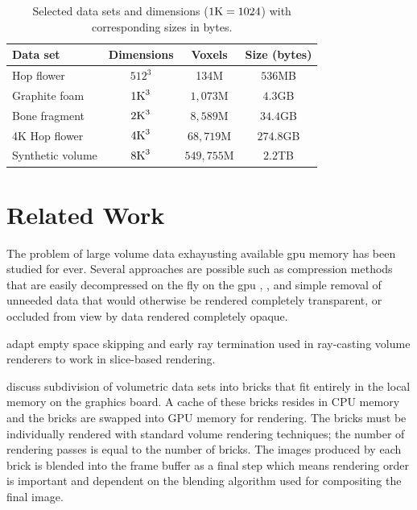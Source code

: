 \documentclass[journal]{vgtc}                %
\begin{document}
\begin{table}[h]
 	 \caption{Selected data sets and dimensions ($1\textnormal{K}=\nobreak1024$) 
	 	 	with corresponding sizes in bytes.}\label{table:targetedDataSets}
	 \scriptsize
	\begin{center}
		\begin{tabular}{lccc}
			\textbf{Data set} & \textbf{Dimensions} & \textbf{Voxels} & \textbf{Size} (bytes)\\
			\hline
			Hop flower & $512^3$ & 134M & $536$MB \\
			Graphite foam & $1\textnormal{K}^3$ & $1,073$M & $4.3$GB  \\
			Bone fragment & $2\textnormal{K}^3$ & $8,589$M & $34.4$GB  \\
			4K Hop flower & $4\textnormal{K}^3$ & $68,719$M & $274.8$GB \\
			Synthetic volume & $8\textnormal{K}^3$ & $549,755$M & $2.2$TB  \\
		\end{tabular}
	\end{center}
\end{table}

\section{Related Work}
The problem of large volume data exhayusting available gpu memory has been studied
for ever. Several approaches are possible such as compression methods that are easily
decompressed on the fly on the gpu \cite{Muraki1993}, \cite{Ihm1999}, and 
simple removal of unneeded data that would otherwise be rendered completely transparent, 
or occluded from view by data rendered completely opaque.

\cite{Li2003} adapt empty space skipping and early ray termination used in
ray-casting volume renderers to work in slice-based rendering. 

\cite{Engel2004} discuss subdivision of volumetric data sets into bricks that
fit entirely in the local memory on the graphics board.  A cache of these
bricks resides in CPU memory and the bricks are swapped into GPU memory for
rendering. The bricks must be individually rendered with standard volume
rendering techniques; the number of rendering passes is equal to the number of
bricks.  The images produced by each brick is blended into the frame buffer as
a final step which means rendering order is important and dependent on 
the blending algorithm used for compositing the final image.  
\end{document}
